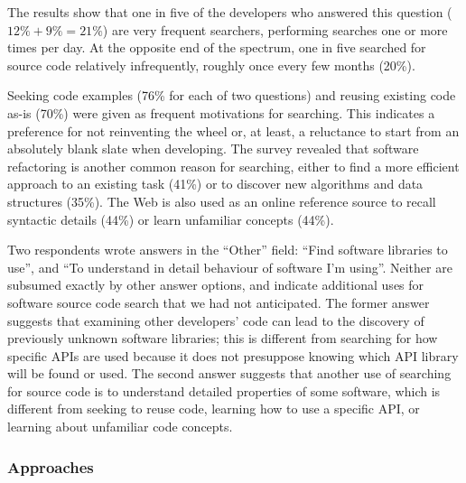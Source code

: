 \documentclass{casicswhitepaper}
\begin{document}
The results show that one in five of the developers who answered this question ($12\% + 9\% = 21\%$) are very frequent searchers, performing searches one or more times per day.  At the opposite end of the spectrum, one in five searched for source code relatively infrequently, roughly once every few months (20\%).

Seeking code examples (76\% for each of two questions) and reusing existing code as-is (70\%) were given as frequent motivations for searching.  This indicates a preference for not reinventing the wheel or, at least, a reluctance to start from an absolutely blank slate when developing.  The survey revealed that software refactoring is another common reason for searching, either to find a more efficient approach to an existing task (41\%) or to discover new algorithms and data structures (35\%). The Web is also used as an online reference source to recall syntactic details (44\%) or learn unfamiliar concepts (44\%). %

Two respondents wrote answers in the ``Other'' field: ``Find software libraries to use'', and ``To understand in detail behaviour of software I'm using''.  Neither are subsumed exactly by other answer options, and indicate additional uses for software source code search that we had not anticipated.  The former answer suggests that examining other developers' code can lead to the discovery of previously unknown software libraries; this is different from searching for how specific APIs are used because it does not presuppose knowing which API library will be found or used.  The second answer suggests that another use of searching for source code is to understand detailed properties of some software, which is different from seeking to reuse code, learning how to use a specific API, or learning about unfamiliar code concepts.


\subsubsection{Approaches}
\label{approaches-find-src}
\end{document}
